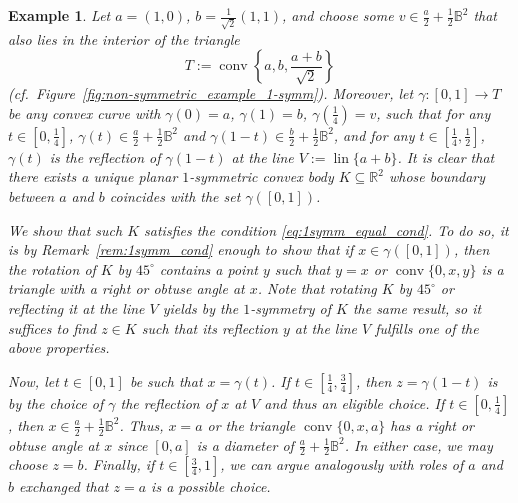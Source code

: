 \documentclass[12pt,a4paper]{article}
\newtheorem{exam}[twr]{Example}
\theoremstyle{definition}
\DeclareMathOperator{\conv}{conv}
\DeclareMathOperator{\lin}{lin}
\newcommand\R{\mathbb{R}}
\newcommand\B{\mathbb{B}}
\begin{document}
\begin{exam}
\label{ex:stab_equal_cond_bodies}
Let $a = (1,0)$, $b = \frac{1}{\sqrt{2}}(1,1)$, and choose some $v \in \frac{a}{2} + \frac{1}{2} \B^2$ that also lies in the interior of the triangle
$$ T := \conv \left\{ a, b, \frac{a + b}{\sqrt{2}} \right\} $$
(cf.~Figure~\ref{fig:non-symmetric_example_1-symm}). Moreover, let $\gamma \colon [0,1] \to T$ be any convex curve with $\gamma(0) = a$, $\gamma(1) = b$, $\gamma(\frac{1}{4}) = v$, such that for any $t \in [0,\frac{1}{4}]$, $\gamma(t) \in \frac{a}{2} + \frac{1}{2} \B^2$ and $\gamma(1-t) \in \frac{b}{2} + \frac{1}{2} \B^2$, and for any $t \in [\frac{1}{4},\frac{1}{2}]$, $\gamma(t)$ is the reflection of $\gamma(1-t)$ at the line $V := \lin\{ a+b \}$. It is clear that there exists a unique planar $1$-symmetric convex body $K \subseteq \R^2$ whose boundary between $a$ and $b$ coincides with the set $\gamma([0, 1])$.

We show that such $K$ satisfies the condition \eqref{eq:1symm_equal_cond}. To do so, it is by Remark~\ref{rem:1symm_cond} enough to show that if $x \in \gamma([0,1])$, then the rotation of $K$ by $45^\circ$ contains a point $y$ such that $y = x$ or $\conv \{0,x,y\} $ is a triangle with a right or obtuse angle at $x$. Note that rotating $K$ by $45^\circ$ or reflecting it at the line $V$ yields by the $1$-symmetry of $K$ the same result, so it suffices to find $z \in K$ such that its reflection $y$ at the line $V$ fulfills one of the above properties.

Now, let $t \in [0,1]$ be such that $x = \gamma(t)$. If $t \in [\frac{1}{4},\frac{3}{4}]$, then $z = \gamma(1-t)$ is by the choice of $\gamma$ the reflection of $x$ at $V$ and thus an eligible choice. If $t \in [0,\frac{1}{4}]$, then $x \in \frac{a}{2} + \frac{1}{2} \B^2$. Thus, $x = a$ or the triangle $\conv \{0,x,a\} $ has a right or obtuse angle at $x$ since $[0,a]$ is a diameter of $\frac{a}{2} + \frac{1}{2} \B^2$. In either case, we may choose $z = b$. Finally, if $t \in [\frac{3}{4},1]$, we can argue analogously with roles of $a$ and $b$ exchanged that $z = a$ is a possible choice.



\begin{figure}[ht]
\def\r{0.25}
\def\ang{22.5}
\def\scale{7.5}
%
\centering
{}
\end{figure}
\end{exam}
\end{document}
